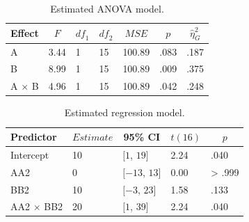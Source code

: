\documentclass[12pt,]{krantz}
\newenvironment{Shaded}{\begin{snugshade}}{\end{snugshade}}
\newcommand{\KeywordTok}[1]{\textcolor[rgb]{0.13,0.29,0.53}{\textbf{#1}}}
\newcommand{\DataTypeTok}[1]{\textcolor[rgb]{0.13,0.29,0.53}{#1}}
\newcommand{\DecValTok}[1]{\textcolor[rgb]{0.00,0.00,0.81}{#1}}
\newcommand{\StringTok}[1]{\textcolor[rgb]{0.31,0.60,0.02}{#1}}
\newcommand{\OperatorTok}[1]{\textcolor[rgb]{0.81,0.36,0.00}{\textbf{#1}}}
\newcommand{\NormalTok}[1]{#1}
\theoremstyle{definition}
\theoremstyle{definition}
\theoremstyle{definition}
\theoremstyle{remark}
\begin{document}
\begin{table}[!htbp]

\begin{center}
\begin{threeparttable}

\caption{\label{tab:table16}Estimated ANOVA model.}

\begin{tabular}{lllllll}
\toprule
Effect & \multicolumn{1}{c}{$F$} & \multicolumn{1}{c}{$\mathit{df}_1$} & \multicolumn{1}{c}{$\mathit{df}_2$} & \multicolumn{1}{c}{$\mathit{MSE}$} & \multicolumn{1}{c}{$p$} & \multicolumn{1}{c}{$\hat{\eta}^2_G$}\\
\midrule
A & 3.44 & 1 & 15 & 100.89 & .083 & .187\\
B & 8.99 & 1 & 15 & 100.89 & .009 & .375\\
A $\times$ B & 4.96 & 1 & 15 & 100.89 & .042 & .248\\
\bottomrule
\end{tabular}

\end{threeparttable}
\end{center}

\end{table}

\begin{Shaded}
\end{Shaded}

\begin{table}[!htbp]

\begin{center}
\begin{threeparttable}

\caption{\label{tab:table17}Estimated regression model.}

\begin{tabular}{lllll}
\toprule
Predictor & \multicolumn{1}{c}{$Estimate$} & \multicolumn{1}{c}{95\% CI} & \multicolumn{1}{c}{$t(16)$} & \multicolumn{1}{c}{$p$}\\
\midrule
Intercept & 10 & $[1$, $19]$ & 2.24 & .040\\
AA2 & 0 & $[-13$, $13]$ & 0.00 & > .999\\
BB2 & 10 & $[-3$, $23]$ & 1.58 & .133\\
AA2 $\times$ BB2 & 20 & $[1$, $39]$ & 2.24 & .040\\
\bottomrule
\end{tabular}

\end{threeparttable}
\end{center}

\end{table}
\end{document}
